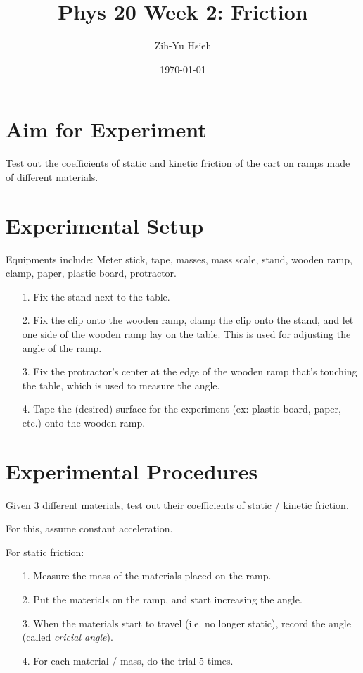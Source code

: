 \documentclass{article}
\title{Phys 20 Week 2: Friction}
\author{Zih-Yu Hsieh}
\date{\today}
\begin{document}
\maketitle

\section{Aim for Experiment}

Test out the coefficients of static and kinetic friction of the cart on ramps made of different materials.

\section{Experimental Setup}
Equipments include: Meter stick, tape, masses, mass scale, stand, wooden ramp, clamp, paper, plastic board, protractor.

\begin{itemize}
    \item[1.] Fix the stand next to the table.
    \item[2.] Fix the clip onto the wooden ramp, clamp the clip onto the stand, and let one side of the wooden ramp lay on the table. This is used for adjusting the angle of the ramp.
    \item[3.] Fix the protractor's center at the edge of the wooden ramp that's touching the table, which is used to measure the angle.
    \item[4.] Tape the (desired) surface for the experiment (ex: plastic board, paper, etc.) onto the wooden ramp.
\end{itemize}

\section{Experimental Procedures}

Given 3 different materials, test out their coefficients of static / kinetic friction.

For this, assume constant acceleration.

For static friction:
\begin{itemize}
    \item[1.] Measure the mass of the materials placed on the ramp.
    \item[2.] Put the materials on the ramp, and start increasing the angle.
    \item[3.] When the materials start to travel (i.e. no longer static), record the angle (called \emph{cricial angle}).
    \item[4.] For each material / mass, do the trial 5 times.
\end{itemize}
\end{document}
